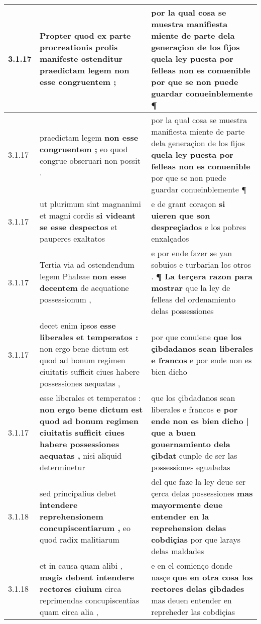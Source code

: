 \begin{tabular}{|p{1cm}|p{6.5cm}|p{6.5cm}|}
3.1.17 & Propter quod ex parte procreationis prolis manifeste ostenditur \textbf{ praedictam legem } non esse congruentem ; & por la qual cosa se muestra manifiesta miente de parte dela generaçion de los fijos \textbf{ quela ley puesta por felleas non es conuenible } por que se non puede guardar conueinblemente ¶ \\\hline
3.1.17 & praedictam legem \textbf{ non esse congruentem ; } eo quod congrue obseruari non possit . & por la qual cosa se muestra manifiesta miente de parte dela generaçion de los fijos \textbf{ quela ley puesta por felleas non es conuenible } por que se non puede guardar conueinblemente ¶ \\\hline
3.1.17 & ut plurimum sint magnanimi et magni cordis \textbf{ si videant se esse despectos } et pauperes exaltatos & e de grant coraçon \textbf{ si uieren que son despreçiados } e los pobres enxalçados \\\hline
3.1.17 & Tertia via ad ostendendum legem Phaleae \textbf{ non esse decentem } de aequatione possessionum , & e por ende fazer se yan sobuios e turbarian los otros . \textbf{ ¶ La terçera razon para mostrar } que la ley de felleas del ordenamiento delas possessiones \\\hline
3.1.17 & decet enim ipsos \textbf{ esse liberales et temperatos : } non ergo bene dictum est quod ad bonum regimen ciuitatis sufficit ciues habere possessiones aequatas , & por que conuiene \textbf{ que los çibdadanos sean liberales e francos } e por ende non es bien dicho \\\hline
3.1.17 & esse liberales et temperatos : \textbf{ non ergo bene dictum est quod ad bonum regimen ciuitatis sufficit ciues habere possessiones aequatas , } nisi aliquid determinetur & que los çibdadanos sean liberales e francos \textbf{ e por ende non es bien dicho | que a buen gouernamiento dela çibdat } cunple de ser las possessiones egualadas \\\hline
3.1.18 & sed principalius debet \textbf{ intendere reprehensionem concupiscentiarum , } eo quod radix malitiarum & del que faze la ley deue ser çerca delas possessiones \textbf{ mas mayormente deue entender en la reprehension delas cobdiçias } por que larays delas maldades \\\hline
3.1.18 & et in causa quam alibi , \textbf{ magis debent intendere rectores ciuium } circa reprimendas concupiscentias quam circa alia , & e en el comienço donde nasçe \textbf{ que en otra cosa los rectores delas çibdades } mas deuen entender en repreheder las cobdiçias \\\hline

\end{tabular}
